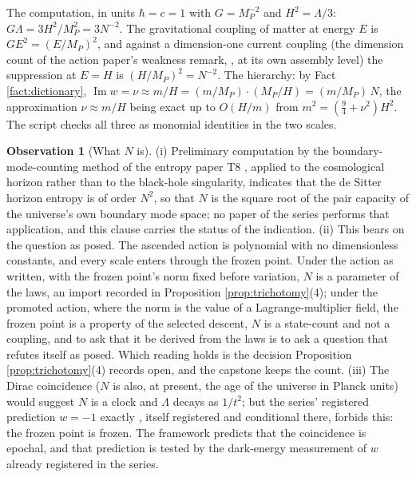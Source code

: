 \documentclass[11pt]{article}
\theoremstyle{definition}
\newtheorem{observation}[theorem]{Observation}
\begin{document}
The computation, in units $\hbar = c = 1$ with $G = M_{P}^{-2}$ and $H^{2} = \Lambda/3$: $G\Lambda = 3H^{2}/M_{P}^{2} = 3N^{-2}$. The gravitational coupling of matter at energy $E$ is $GE^{2} = (E/M_{P})^{2}$, and against a dimension-one current coupling (the dimension count of the action paper's weakness remark, \cite[Rem.~5.3]{ButlerT10}, at its own assembly level) the suppression at $E = H$ is $(H/M_{P})^{2} = N^{-2}$. The hierarchy: by Fact \ref{fact:dictionary}, $\operatorname{Im} w = \nu \approx m/H = (m/M_{P}) \cdot (M_{P}/H) = (m/M_{P})\,N$, the approximation $\nu \approx m/H$ being exact up to $O(H/m)$ from $m^{2} = (\tfrac94 + \nu^{2})H^{2}$. The script checks all three as monomial identities in the two scales.

\begin{observation}[What $N$ is]\label{obs:whatN}
(i) Preliminary computation by the boundary-mode-counting method of the entropy paper T8 \cite[\S 3, Thm.~3.4]{ButlerT8}, applied to the cosmological horizon rather than to the black-hole singularity, indicates that the de Sitter horizon entropy is of order $N^{2}$, so that $N$ is the square root of the pair capacity of the universe's own boundary mode space; no paper of the series performs that application, and this clause carries the status of the indication. (ii) This bears on the question as posed. The ascended action is polynomial with no dimensionless constants, and every scale enters through the frozen point. Under the action as written, with the frozen point's norm fixed before variation, $N$ is a parameter of the laws, an import recorded in Proposition \ref{prop:trichotomy}(4); under the promoted action, where the norm is the value of a Lagrange-multiplier field, the frozen point is a property of the selected descent, $N$ is a state-count and not a coupling, and to ask that it be derived from the laws is to ask a question that refutes itself as posed. Which reading holds is the decision Proposition \ref{prop:trichotomy}(4) records open, and the capstone \cite[Table~1]{ButlerT17} keeps the count. (iii) The Dirac coincidence ($N$ is also, at present, the age of the universe in Planck units) would suggest $N$ is a clock and $\Lambda$ decays as $1/t^{2}$; but the series' registered prediction $w = -1$ exactly \cite[Prop.~4.2(iii)]{ButlerT10}, itself registered and conditional there, forbids this: the frozen point is frozen. The framework predicts that the coincidence is epochal, and that prediction is tested by the dark-energy measurement of $w$ already registered in the series.
\end{observation}
\end{document}
